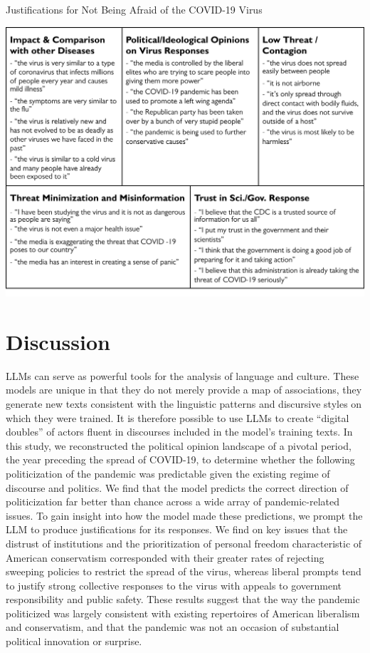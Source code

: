 \documentclass{article} %
\let\oldtable\table
\let\endoldtable\endtable
\renewenvironment{table}[1][!htbp]{ %
  \oldtable[#1]
  \footnotesize %
}{
  \endoldtable
}
\begin{document}
\begin{table}
  \caption{Justifications for Not Being Afraid of the COVID-19 Virus}
  \label{tab:notafraid}
  \centering
  \includegraphics[width=\textwidth]{./figures/media/Table6.png}
\end{table}

\section*{Discussion}

LLMs can serve as powerful tools for the analysis of language and
culture. These models are unique in that they do not merely provide a
map of associations, they generate new texts consistent with the
linguistic patterns and discursive styles on which they were trained. It
is therefore possible to use LLMs to create ``digital doubles'' of
actors fluent in discourses included in the model's training texts. In
this study, we reconstructed the political opinion landscape of a
pivotal period, the year preceding the spread of COVID-19, to determine
whether the following politicization of the pandemic was predictable
given the existing regime of discourse and politics. We find that the
model predicts the correct direction of politicization far better than
chance across a wide array of pandemic-related issues. To gain insight
into how the model made these predictions, we prompt the LLM to produce
justifications for its responses. We find on key issues that the
distrust of institutions and the prioritization of personal freedom
characteristic of American conservatism corresponded with their greater
rates of rejecting sweeping policies to restrict the spread of the
virus, whereas liberal prompts tend to justify strong collective
responses to the virus with appeals to government responsibility and
public safety. These results suggest that the way the pandemic
politicized was largely consistent with existing repertoires of American
liberalism and conservatism, and that the pandemic was not an occasion
of substantial political innovation or surprise.
\end{document}

